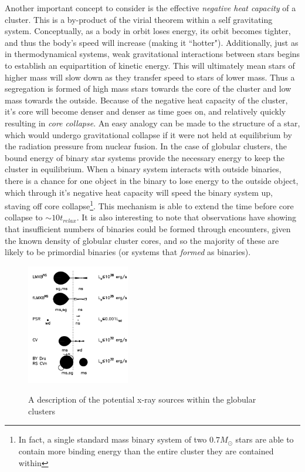 \documentclass[aps,
                pra,  
                a4paper, 
                amsmath, 
                amssymb, 
                preprint,
                tightenlines,  
                amsfonts,
                nofootinbib,
                notitlepage
            ]{revtex4-2}
\begin{document}
Another important concept to consider is the effective \textit{negative heat capacity} of a cluster. This is a by-product of the virial theorem within a self gravitating system. Conceptually, as a body in orbit loses energy, its orbit becomes tighter, and thus the body's speed will increase (making it ``hotter"). Additionally, just as in thermodynamical systems, weak gravitational interactions between stars begins to establish an equipartition of kinetic energy. This will ultimately mean stars of higher mass will slow down as they transfer speed to stars of lower mass. Thus a segregation is formed of high mass stars towards the core of the cluster and low mass towards the outside. Because of the negative heat capacity of the cluster, it's core will become denser and denser as time goes on, and relatively quickly resulting in \textit{core collapse}. An easy analogy can be made to the structure of a star, which would undergo gravitational collapse if it were not held at equilibrium by the radiation pressure from nuclear fusion. In the case of globular clusters, the bound energy of binary star systems provide the necessary energy to keep the cluster in equilibrium. When a binary system interacts with outside binaries, there is a chance for one object in the binary to lose energy to the outside object, which through it's negative heat capacity will speed the binary system up, staving off core collapse\footnote{In fact, a single standard mass binary system of two $0.7M_{\odot}$ stars are able to contain more binding energy than the entire cluster they are contained within}. This mechanism is able to extend the time before core collapse to $\sim 10t_{relax}$. It is also interesting to note that observations have showing that insufficient numbers of binaries could be formed through encounters, given the known density of globular cluster cores, and so the majority of these are likely to be primordial binaries (or systems that \textit{formed} as binaries).
\par
\begin{figure}
    \caption{A description of the potential x-ray sources within the globular clusters\cite{Verbunt2006}}
    \includegraphics[width=0.4\textwidth]{img/gc-xray-sources.png}
    \label{fig:gc-xray-sources}
\end{figure}
\end{document}
